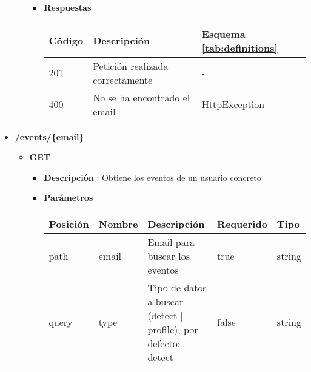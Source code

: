 \begin{itemize}
\begin{itemize}
\begin{itemize}
                    
                        \item \textbf{Respuestas}
                            \begin{table}[h]
                                \centering
                                \begin{tabular}{ l l l } 
                                    \toprule
                                     Código & Descripción & Esquema \ref{tab:definitions} \\ 
                                     \midrule
                                    201 & Petición realizada correctamente & - \\ 
                                    400 & No se ha encontrado el email & HttpException \\  
                                    \bottomrule
                                \end{tabular} 
                            \end{table}
                    \end{itemize} 
                \end{itemize} 
\newpage
\item \textbf{/events/\{email\}}
            \begin{itemize} 
                 \item \textbf{GET} 
                     \begin{itemize} 
                         \item \textbf{Descripción} : Obtiene los eventos de un usuario concreto
                    
                        \item \textbf{Parámetros}
                            
                            \begin{table}[!h]
                                \centering
                                \begin{tabular}{ l l p{6cm} l l} 
                                    \toprule
                                    Posición & Nombre & Descripción & Requerido & Tipo \\ 
                                    \midrule
                                    path & email & Email para buscar los eventos  & true & string \\ 
                                    query & type & Tipo de datos a buscar (detect | profile), por defecto: detect & false & string \\  
                                    \bottomrule
                                 \end{tabular} 
                            \end{table}
                    

\end{itemize}
\end{itemize}
\end{itemize}
